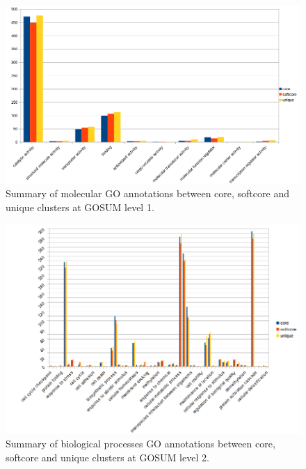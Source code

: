\documentclass[12pt]{article}
\begin{document}
\begin{figure} 
\includegraphics[scale=.65]{3Aug18_cluster-investigation/figures/Gambi-gosum1-molec-graph.png} 
\caption{Summary of molecular GO annotations between core, softcore and unique clusters at GOSUM level 1.} 
\label{fig:}
\end{figure} 
\FloatBarrier

\begin{figure} 
\includegraphics[scale=.75]{3Aug18_cluster-investigation/figures/Gambi-gosum2-bio-graph.png} 
\caption{Summary of biological processes GO annotations between core, softcore and unique clusters at GOSUM level 2.} 
\label{fig:}
\end{figure} 
\FloatBarrier
\end{document}
